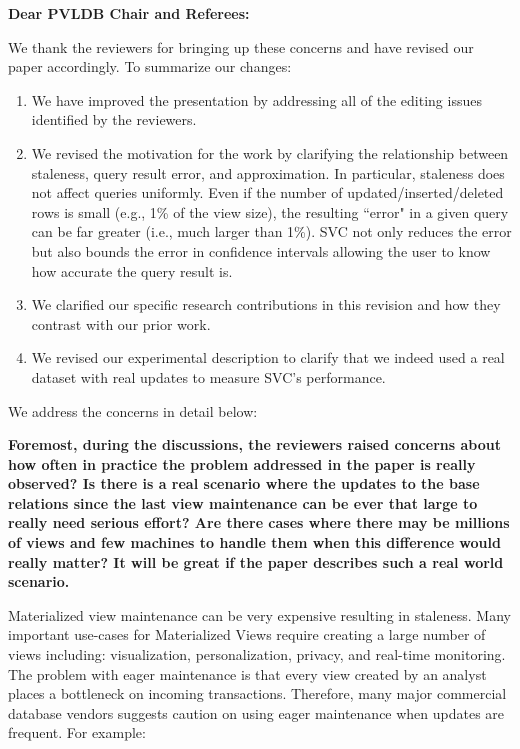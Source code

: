 {\noindent \normalsize \bf Dear PVLDB Chair and Referees: }

We thank the reviewers for bringing up these concerns and have revised our paper accordingly. To summarize our changes:
\begin{enumerate}[noitemsep]
\item We have improved the presentation by addressing all of the editing issues identified by the reviewers.
\item We revised the motivation for the work by clarifying the relationship between staleness, query result error, and approximation. In particular, staleness does not affect queries uniformly. Even if the number of updated/inserted/deleted rows is small (e.g., 1\% of the view size), the resulting ``error" in a given query can be far greater (i.e., much larger than 1\%). %
SVC not only reduces the error but also bounds the error in confidence intervals allowing the user to know how accurate the query result is.
\item We clarified our specific research contributions in this revision and how they contrast with our prior work.
\item We revised our experimental description to clarify that we indeed used a real dataset with real updates to measure SVC's performance. 
\end{enumerate}

We address the concerns in detail below: 

\vspace{1.5em}

\textbf{Foremost, during the discussions, the reviewers raised concerns about how often in practice the problem addressed in the paper is really observed? Is there is a real scenario where the updates to the base relations since the last view maintenance can be ever that large to really need serious effort? Are there cases where there may be millions of views and few machines to handle them when this difference would really matter? It will be great if the paper describes such a real world scenario.}

Materialized view maintenance can be very expensive resulting in staleness. Many important use-cases for Materialized Views require creating a large number of views including: visualization, personalization, privacy, and real-time monitoring. The problem with eager maintenance is that every view created by an analyst places a bottleneck on incoming transactions.  Therefore, many major commercial database vendors suggests caution on using eager maintenance when updates are frequent. For example:

